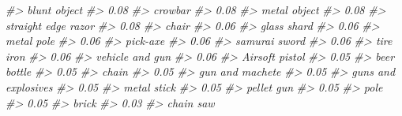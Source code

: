 \documentclass[
  12pt,
  openany]{book}
\newenvironment{Shaded}{\begin{snugshade}}{\end{snugshade}}
\newcommand{\CommentTok}[1]{\textcolor[rgb]{0.37,0.37,0.37}{\textit{#1}}}
\begin{document}
\begin{Shaded}
\begin{Highlighting}[]
\CommentTok{\#\textgreater{}                     blunt object }
\CommentTok{\#\textgreater{}                             0.08 }
\CommentTok{\#\textgreater{}                          crowbar }
\CommentTok{\#\textgreater{}                             0.08 }
\CommentTok{\#\textgreater{}                     metal object }
\CommentTok{\#\textgreater{}                             0.08 }
\CommentTok{\#\textgreater{}              straight edge razor }
\CommentTok{\#\textgreater{}                             0.08 }
\CommentTok{\#\textgreater{}                            chair }
\CommentTok{\#\textgreater{}                             0.06 }
\CommentTok{\#\textgreater{}                      glass shard }
\CommentTok{\#\textgreater{}                             0.06 }
\CommentTok{\#\textgreater{}                       metal pole }
\CommentTok{\#\textgreater{}                             0.06 }
\CommentTok{\#\textgreater{}                         pick{-}axe }
\CommentTok{\#\textgreater{}                             0.06 }
\CommentTok{\#\textgreater{}                    samurai sword }
\CommentTok{\#\textgreater{}                             0.06 }
\CommentTok{\#\textgreater{}                        tire iron }
\CommentTok{\#\textgreater{}                             0.06 }
\CommentTok{\#\textgreater{}                  vehicle and gun }
\CommentTok{\#\textgreater{}                             0.06 }
\CommentTok{\#\textgreater{}                   Airsoft pistol }
\CommentTok{\#\textgreater{}                             0.05 }
\CommentTok{\#\textgreater{}                      beer bottle }
\CommentTok{\#\textgreater{}                             0.05 }
\CommentTok{\#\textgreater{}                            chain }
\CommentTok{\#\textgreater{}                             0.05 }
\CommentTok{\#\textgreater{}                  gun and machete }
\CommentTok{\#\textgreater{}                             0.05 }
\CommentTok{\#\textgreater{}              guns and explosives }
\CommentTok{\#\textgreater{}                             0.05 }
\CommentTok{\#\textgreater{}                      metal stick }
\CommentTok{\#\textgreater{}                             0.05 }
\CommentTok{\#\textgreater{}                       pellet gun }
\CommentTok{\#\textgreater{}                             0.05 }
\CommentTok{\#\textgreater{}                             pole }
\CommentTok{\#\textgreater{}                             0.05 }
\CommentTok{\#\textgreater{}                            brick }
\CommentTok{\#\textgreater{}                             0.03 }
\CommentTok{\#\textgreater{}                        chain saw }

\end{Highlighting}
\end{Shaded}
\end{document}
